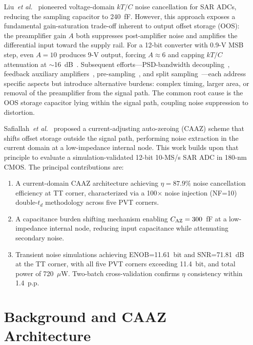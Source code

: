 \documentclass[journal]{IEEEtran}
\begin{document}
Liu~\textit{et al.}~\cite{liu13bit0005mm240MS2020} pioneered voltage-domain $kT/C$ noise cancellation for SAR ADCs, reducing the sampling capacitor to 240~fF. However, this approach exposes a fundamental gain-saturation trade-off inherent to output offset storage (OOS): the preamplifier gain $A$ both suppresses post-amplifier noise and amplifies the differential input toward the supply rail. For a 12-bit converter with 0.9-V MSB step, even $A=10$ produces 9-V output, forcing $A\approx6$ and capping $kT/C$ attenuation at $\sim$16~dB~\cite{liu13bit0005mm240MS2020}. Subsequent efforts---PSD-bandwidth decoupling~\cite{li2020_SAR}, feedback auxiliary amplifiers~\cite{won2024_13b}, pre-sampling~\cite{guImprovedKTNoise2024}, and split sampling~\cite{huang5MS16bitLownoise2025}---each address specific aspects but introduce alternative burdens: complex timing, larger area, or removal of the preamplifier from the signal path. The common root cause is the OOS storage capacitor lying within the signal path, coupling noise suppression to distortion.

Safiallah~\textit{et al.}~\cite{safiallah2023_Currentadjusting} proposed a current-adjusting auto-zeroing (CAAZ) scheme that shifts offset storage outside the signal path, performing noise extraction in the current domain at a low-impedance internal node. This work builds upon that principle to evaluate a simulation-validated 12-bit 10-MS/s SAR ADC in 180-nm CMOS. The principal contributions are:
\begin{enumerate}
    \item A current-domain CAAZ architecture achieving $\eta=87.9\%$ noise cancellation efficiency at TT corner, characterized via a 100$\times$ noise injection (NF=10) double-$t_d$ methodology across five PVT corners.
    \item A capacitance burden shifting mechanism enabling $C_{\rm AZ}=300$~fF at a low-impedance internal node, reducing input capacitance while attenuating secondary noise.
    \item Transient noise simulations achieving ENOB=11.61~bit and SNR=71.81~dB at the TT corner, with all five PVT corners exceeding 11.4~bit, and total power of 720~$\mu$W. Two-batch cross-validation confirms $\eta$ consistency within 1.4~p.p.
\end{enumerate}

\section{Background and CAAZ Architecture}
\label{sec:caaz}
\end{document}
